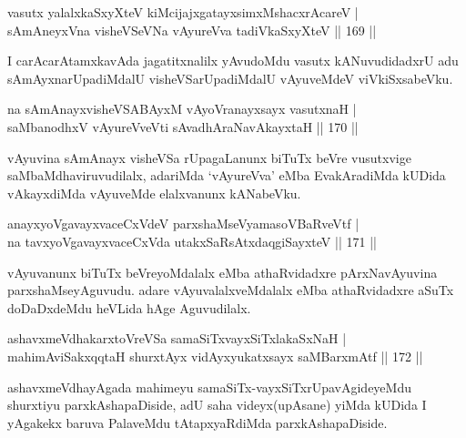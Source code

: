 \begin{shl}
vasutx yalalxkaSxyXteV kiMcijajxgatayxsimxMshacxrAcareV |\\
sAmAneyxVna visheVSeVNa vAyureVva tadiVkaSxyXteV \hfill || 169 ||
\end{shl}

\begin{artha}
I carAcarAtamxkavAda jagatitxnalilx yAvudoMdu vasutx kANuvudidadxrU adu sAmAyxnarUpadiMdalU visheVSarUpadiMdalU vAyuveMdeV viVkiSxsabeVku.
\end{artha}

\begin{shl}
na sAmAnayxvisheVSABAyxM vAyoVranayxsayx vasutxnaH |\\
saMbanodhxV vAyureVveVti sAvadhAraNavAkayxtaH \hfill || 170 ||
\end{shl}

\begin{artha}
vAyuvina sAmAnayx visheVSa rUpagaLanunx biTuTx beVre vusutxvige saMbaMdhaviruvudilalx, adariMda `vAyureVva' eMba EvakAradiMda kUDida vAkayxdiMda vAyuveMde elalxvanunx kANabeVku.
\end{artha}


\begin{shl}
anayxyoVgavayxvaceCxVdeV parxshaMseVyamasoVBaRveVtf |\\
na tavxyoVgavayxvaceCxVda utakxSaRsAtxdaqgiSayxteV \hfill || 171 ||
\end{shl}

\begin{artha}
vAyuvanunx biTuTx beVreyoMdalalx eMba athaRvidadxre pArxNavAyuvina parxshaMseyAguvudu. adare vAyuvalalxveMdalalx eMba athaRvidadxre aSuTx doDaDxdeMdu heVLida hAge Aguvudilalx.
\end{artha}


\begin{shl}
ashavxmeVdhakarxtoVreVSa samaSiTxvayxSiTxlakaSxNaH |\\
mahimA\s \s viSakxqqtaH shurxtAyx vidAyxyukatxsayx saMBarxmAtf \hfill || 172 ||
\end{shl}

\begin{artha}
ashavxmeVdhayAgada mahimeyu samaSiTx-vayxSiTxrUpavAgideyeMdu shurxtiyu parxkAshapaDiside, adU saha videyx(upAsane) yiMda kUDida I yAgakekx baruva PalaveMdu tAtapxyaRdiMda parxkAshapaDiside.
\end{artha}

